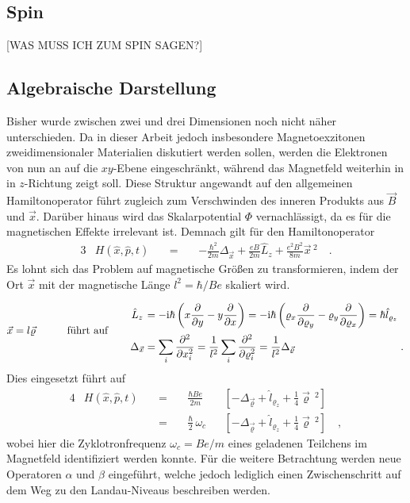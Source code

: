 \documentclass[a4paper,11pt, twoside]{article}
\newcommand{\+}{\dagger}
\newcommand{\pd}[2]{\frac{\partial #1}{\partial #2}}
\renewcommand{\it}{\mathit}
\renewcommand{\v}{\vec}
\renewcommand{\^}{\hat}
\renewcommand{\tt}{\text}
\renewcommand{\~}{\widetilde}
\begin{document}
\subsection{Spin}
[WAS MUSS ICH ZUM SPIN SAGEN?]
\subsection{Algebraische Darstellung}
Bisher wurde zwischen zwei und drei Dimensionen noch nicht näher unterschieden. Da in dieser Arbeit jedoch insbesondere Magnetoexzitonen zweidimensionaler Materialien diskutiert werden sollen, werden die Elektronen von nun an auf die $xy$-Ebene eingeschränkt, während das Magnetfeld weiterhin in in $z$-Richtung zeigt soll. Diese Struktur angewandt auf den allgemeinen Hamiltonoperator führt zugleich zum Verschwinden des inneren Produkts aus $\v B$ und $\v x$. Darüber hinaus wird das Skalarpotential $\it \Phi$ vernachlässigt, da es für die magnetischen Effekte irrelevant ist. Demnach gilt für den Hamiltonoperator 
\begin{alignat*}{3}
& H(\^ x,\^ p,t)&& \ =\  && -\frac{\hbar^2}{2m}\Delta_{\v x} + \frac{eB}{2m} \^L_z  +\frac{e^2B^2}{8m}\v x \,^2  \quad .
\end{alignat*}
Es lohnt sich das Problem auf magnetische Größen zu transformieren, indem der Ort $\v x$ mit der magnetische Länge $l^2=\hbar / Be$ skaliert wird.
\begin{alignat*}{4}
\v x  = l \v \varrho  &&\qquad \tt{führt auf} \quad && 
\arraycolsep=1.4pt\def\arraystretch{2.2}
\begin{array}{*1{>{\displaystyle}c} *1{>{\displaystyle}l} *1{>{\displaystyle}r}}
 \^L_z  &= -\tt i \hbar \left (x\pd{}{y}-y\pd{}{x}\right ) =  -\tt i \hbar \left (\varrho_x\pd{}{\varrho_y}-\varrho_y\pd{}{\varrho_x}\right ) = \hbar \^l_{\varrho_z}& \\[4pt]
\Delta_{\v x} &= \sum_i \pd{^2}{x_i ^2} = \frac{1}{l^2}\sum_i \pd{^2}{\varrho_i ^2} = \frac{1}{l^2}\Delta_{\v \varrho} &.
\end{array} 
\end{alignat*}
Dies eingesetzt führt auf  
\begin{alignat*}{4}
& H(\^ x,\^ p,t)&& \ =\  &&\frac{\hbar B e}{2m} && \left [ -\Delta_{\v \varrho} +  \^l_{\varrho_z}  +\frac{1}{4}\v \varrho \,^2 \right ] \\
& && \ = \ && \frac{\hbar }{2}\,\omega_c && \left [ -\Delta_{\v \varrho} +  \^l_{\varrho_z}  +\frac{1}{4}\v \varrho \,^2 \right ] \quad , 
\end{alignat*}
wobei hier die Zyklotronfrequenz $\omega_c= Be/m$ eines geladenen Teilchens im Magnetfeld identifiziert werden konnte. Für die weitere Betrachtung werden neue Operatoren $\alpha$ und $\beta$ eingeführt, welche jedoch lediglich einen Zwischenschritt auf dem Weg zu den Landau-Niveaus beschreiben werden.
\end{document}
